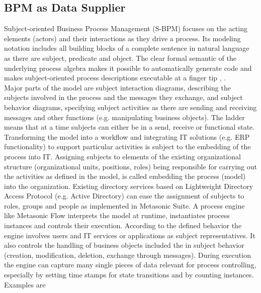\subsection{BPM as Data Supplier}
Subject-oriented Business Process Management (S-BPM) focuses on the acting elements (actors) and their interactions as they drive a process. Its modeling notation includes all building blocks of a complete sentence in natural language as there are subject, predicate and object. The clear formal semantic of the underlying process algebra makes it possible to automatically generate code and makes subject-oriented process descriptions executable at a finger tip \cite{Flei12}, \cite{article:HMD-S-BPM}.
\\
Major parts of the model are subject interaction diagrams, describing the subjects involved in the process and the messages they exchange, and subject behavior diagrams, specifying subject activities as there are sending and receiving messages and other functions (e.g. manipulating business objects). The ladder means that at a time subjects can either be in a send, receive or functional state.
Transforming the model into a workflow and integrating IT solutions (e.g. ERP functionality) to support particular activities is subject to the embedding of the process into IT. Assigning subjects to elements of the existing organizational structure (organizational units, positions, roles) being responsible for carrying out the activities as defined in the model, is called embedding the process (model) into the organization. Existing directory services based on Lightweight Directory Access Protocol (e.g. Active Directory) can ease the assignment of subjects to roles, groups and people as implemented in Metasonic Suite.
A process engine like Metasonic Flow interprets the model at runtime, instantiates process instances and controls their execution. According to the defined behavior the engine involves users and IT services or applications as subject representatives. It also controls the handling of business objects included the in subject behavior (creation, modification, deletion, exchange through messages). During execution the engine can capture many single pieces of data relevant for process controlling, especially by setting time stamps for state transitions and by counting instances. Examples are

